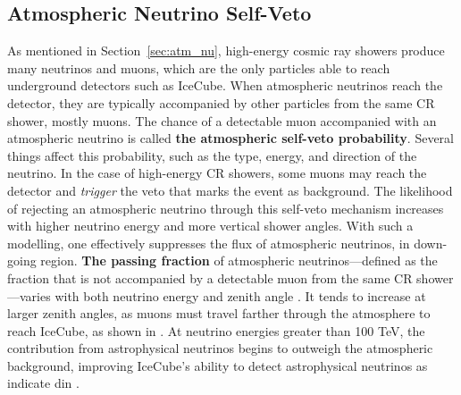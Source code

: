 \subsection*{Atmospheric Neutrino Self-Veto}
\label{sec:selfveto}
As mentioned in Section~\ref{sec:atm_nu}, high-energy cosmic ray showers produce many neutrinos and muons, which are the only particles able to reach underground detectors such as IceCube. When atmospheric neutrinos reach the detector, they are typically accompanied by other particles from the same CR shower, mostly muons. The chance of a detectable muon accompanied with an atmospheric neutrino is called \textbf{the atmospheric self-veto probability}. Several things affect this probability, such as the type, energy, and direction of the neutrino. In the case of high-energy CR showers, some muons may reach the detector and \emph{trigger} the veto that marks the event as background. The likelihood of rejecting an atmospheric neutrino through this self-veto mechanism increases with higher neutrino energy and more vertical shower angles. With such a modelling, one effectively suppresses the flux of atmospheric neutrinos, in down-going region. \textbf{The passing fraction} of atmospheric neutrinos—defined as the fraction that is not accompanied by a detectable muon from the same CR shower—varies with both neutrino energy and zenith angle . It tends to increase at larger zenith angles, as muons must travel farther through the atmosphere to reach IceCube, as shown in . At neutrino energies greater than 100 TeV, the contribution from astrophysical neutrinos begins to outweigh the atmospheric background, improving IceCube's ability to detect astrophysical neutrinos as indicate din .


